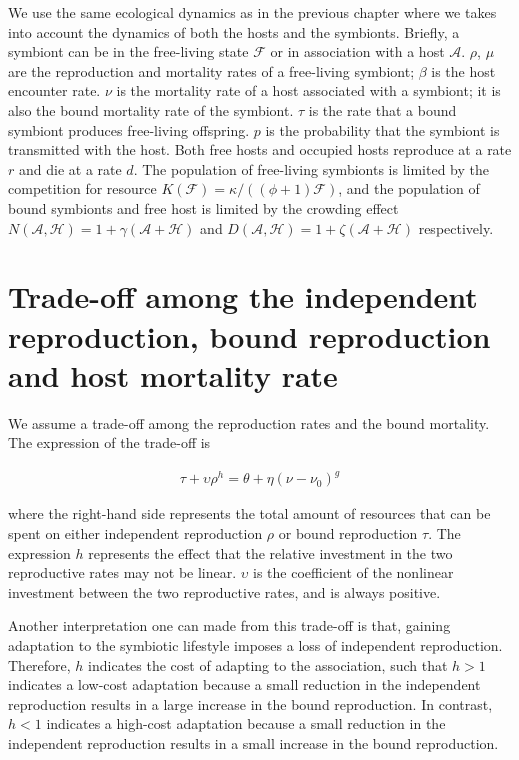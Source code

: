 \documentclass[11.5pt]{article}
\begin{document}
We use the same ecological dynamics as in the previous chapter where we takes into account the dynamics of both the hosts and the symbionts. Briefly, a symbiont can be in the free-living state $\mathcal{F}$ or in association with a host $\mathcal{A}$. $\rho$, $\mu$ are the reproduction and mortality rates of a free-living symbiont; $\beta$ is the host encounter rate. $\nu$ is the mortality rate of a host associated with a symbiont; it is also the bound mortality rate of the symbiont. $\tau$ is the rate that a bound symbiont produces free-living offspring. $p$ is the probability that the symbiont is transmitted with the host. Both free hosts and occupied hosts reproduce at a rate $r$ and die at a rate $d$. The population of free-living symbionts is limited by the competition for resource $K(\mathcal{F})= \kappa/((\phi + 1) \mathcal{F})$, and the population of bound symbionts and free host is limited by the crowding effect $N(\mathcal{A}, \mathcal{H}) = 1 + \gamma(\mathcal{A} + \mathcal{H})$ and $D(\mathcal{A}, \mathcal{H}) = 1 + \zeta (\mathcal{A} + \mathcal{H})$ respectively. 

\section{Trade-off among the independent reproduction, bound reproduction and host mortality rate}

We assume a trade-off among the reproduction rates and the bound mortality. The expression of the trade-off is

\begin{align} \label{troff}
    \tau +  \upsilon \rho^{h} = \theta  + \eta (\nu - \nu_0)^{g}
\end{align}

\noindent where the right-hand side represents the total amount of resources that can be spent on either independent reproduction $\rho$ or bound reproduction $\tau$. The expression $h$ represents the effect that the relative investment in the two reproductive rates may not be linear. $\upsilon$ is the coefficient of the nonlinear investment between the two reproductive rates, and is always positive. 

\medskip

Another interpretation one can made from this trade-off is that, gaining adaptation to the symbiotic lifestyle imposes a loss of independent reproduction. Therefore, $h$ indicates the cost of adapting to the association, such that $h > 1$ indicates a low-cost adaptation because a small reduction in the independent reproduction results in a large increase in the bound reproduction. In contrast, $h < 1$ indicates a high-cost adaptation because a small reduction in the independent reproduction results in a small increase in the bound reproduction. 
\end{document}
